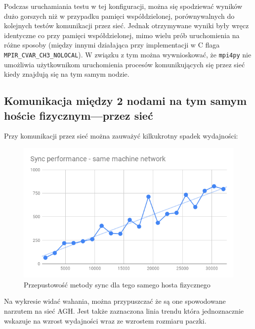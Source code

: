 \documentclass[11pt]{article}
\begin{document}
    Podczas uruchamiania testu w tej konfiguracji, można się spodziewać wyników dużo gorszych niż w przypadku
    pamięci współdzielonej, porównywalnych do kolejnych testów komunikacji przez sieć.
    Jednak otrzymywane wyniki były wręcz identyczne co przy pamięci współdzielonej, mimo wielu prób uruchomienia
    na różne sposoby (między innymi działająca przy implementacji w C flaga \texttt{MPIR\_CVAR\_CH3\_NOLOCAL}).
    W związku z tym można wywnioskować, że \texttt{mpi4py} nie umożliwia użytkownikom uruchomienia procesów
    komunikujących się przez sieć kiedy znajdują się na tym samym nodzie.

    \subsection{Komunikacja między 2 nodami na tym samym hoście fizycznym---przez sieć}
    Przy komunikacji przez sieć można zauważyć kilkukrotny spadek wydajności:
    \begin{figure}[H]
        \includegraphics[width=1\textwidth,frame]{charts/Sync performance - same machine network.png}
        \caption{Przepustowość metody sync dla tego samego hosta fizycznego}
        \label{fig:sync-same-performance}
    \end{figure}
    Na wykresie widać wahania, można przypuszczać że są one spowodowane narzutem na sieć AGH.
    Jest także zaznaczona linia trendu która jednoznacznie wskazuje na wzrost wydajności wraz ze wzrostem rozmiaru paczki.
\end{document}
